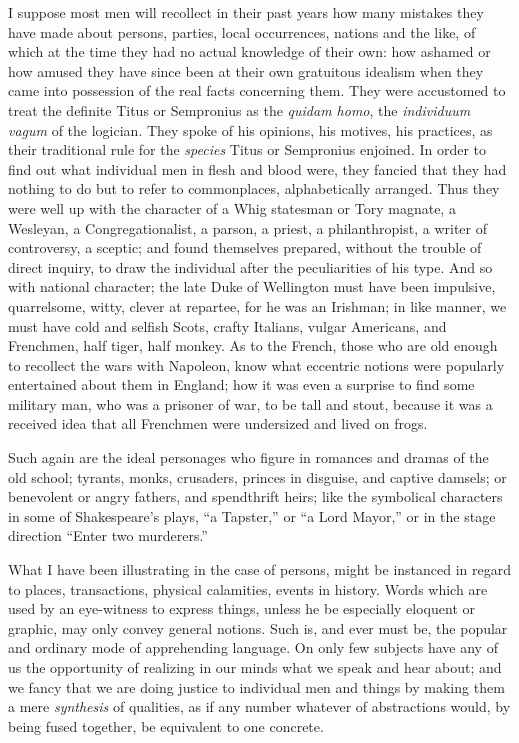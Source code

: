 I suppose most men will recollect in their past years how many
mistakes they have made about persons, parties, local occurrences,
nations and the like, of which at the time they had no actual
knowledge of their own: how ashamed or how amused they have since been
at their own gratuitous idealism when they came into possession of the
real facts concerning them. They were accustomed to treat the definite
Titus or Sempronius as the \emph{quidam homo}, the \emph{individuum vagum}
of the logician. They spoke of his opinions, his motives, his
practices, as their traditional rule for the \emph{species} Titus or
Sempronius enjoined. In order to find out what individual men in flesh
and blood were, they fancied that they had nothing to do but to refer
to commonplaces, alphabetically arranged. Thus they were well up with
the character of a Whig statesman or Tory magnate, a Wesleyan, a
Congregationalist, a parson, a priest, a philanthropist, a writer of
controversy, a sceptic; and found themselves prepared, without the
trouble of direct inquiry, to draw the individual after the
peculiarities of his type. And so with national character; the late
Duke of Wellington must have been impulsive, quarrelsome, witty,
clever at repartee, for he was an Irishman; in like manner, we
must have cold and selfish Scots, crafty Italians, vulgar Americans,
and Frenchmen, half tiger, half monkey. As to the French, those who
are old enough to recollect the wars with Napoleon, know what
eccentric notions were popularly entertained about them in England;
how it was even a surprise to find some military man, who was a
prisoner of war, to be tall and stout, because it was a received idea
that all Frenchmen were undersized and lived on frogs.

Such again are the ideal personages who figure in romances and
dramas of the old school; tyrants, monks, crusaders, princes in
disguise, and captive damsels; or benevolent or angry fathers, and
spendthrift heirs; like the symbolical characters in some of
Shakespeare's plays, ``a Tapster,'' or ``a Lord
Mayor,'' or in the stage direction ``Enter two
murderers.''

What I have been illustrating in the case of persons, might be
instanced in regard to places, transactions, physical calamities,
events in history. Words which are used by an eye-witness to express
things, unless he be especially eloquent or graphic, may only convey
general notions. Such is, and ever must be, the popular and ordinary
mode of apprehending language. On only few subjects have any of us the
opportunity of realizing in our minds what we speak and hear about;
and we fancy that we are doing justice to individual men and things by
making them a mere \emph{synthesis} of qualities, as if any number
whatever of abstractions would, by being fused together, be equivalent
to one concrete.

